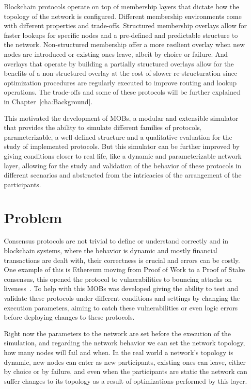 Blockchain protocols operate on top of membership layers that dictate how the topology of the network is configured.
Different membership environments come with different properties and trade-offs. Structured membership overlays allow for faster lookups for
specific nodes and a pre-defined and predictable structure to the network. Non-structured membership offer a more resilient overlay when
new nodes are introduced or existing ones leave, albeit by choice or failure. And overlays that operate by building a partially structured
overlays allow for the benefits of a non-structured overlay at the cost of slower re-structuration since optimization
procedures are regularly executed to improve routing and lookup operations. The trade-offs and some of these protocols will be further
explained in Chapter~\ref{cha:Background}.

This motivated the development of MOBs, a modular and extensible simulator that provides the ability to simulate different families of protocols, 
parameterizable, a well-defined structure and a qualitative evaluation for the study of implemented protocols. But this simulator can be further 
improved by giving conditions closer to real life, like a dynamic and parameterizable network layer, allowing for the study and validation of the
behavior of these protocols in different scenarios and abstracted from the intricacies of the arrangement of the participants.

\section{Problem}\label{sub:problem}
Consensus protocols are not trivial to define or understand correctly and in blockchain systems, where the behavior is dynamic and mostly 
financial transactions are dealt with, their correctness is crucial and errors can be costly. One example of this is Ethereum moving from 
Proof of Work to a Proof of Stake consensus, this opened the protocol to vulnerabilities to bouncing attacks on liveness~\cite{ethereum_analysis}. 
To help with this MOBs was developed giving the ability to test and validate these protocols under different conditions and settings by 
changing the execution parameters, aiming to catch these vulnerabilities or even logic errors before deploying changes to these protocols.

Right now the parameters to the network are set before the execution of the simulation, and regarding the network behavior we can
set the network topology, how many nodes will fail and when. In the real world a network's topology is dynamic, new nodes can enter
as new participants, existing ones can leave, either by choice or by failure, and even when the participants are static the network
can suffer changes to its topology as a result of optimizations performed by this layer.

